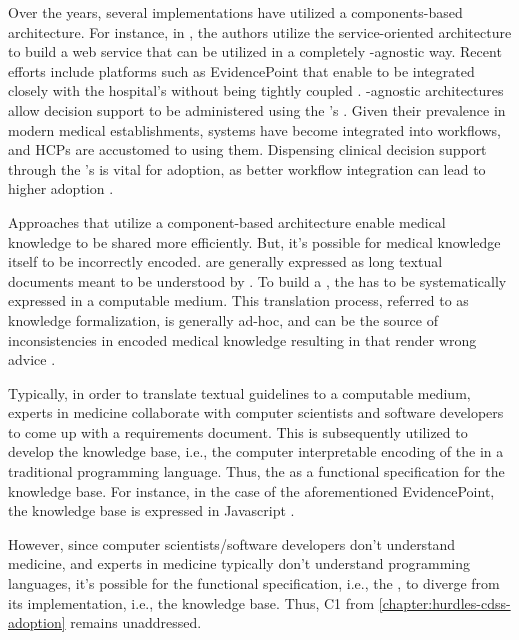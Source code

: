 Over the years, several \CDSS{} implementations have utilized a
components-based architecture. For instance, in \cite{KawamotoJBI10}, the
authors utilize the service-oriented architecture \cite{ErlBook05} to build
a \CDSS{} web service that can be utilized in a completely \EHR{}-agnostic way.
Recent efforts include \CDSSs{} platforms such as
EvidencePoint that enable \CDSS{} to be integrated
closely with the hospital's \EHR{} without being tightly coupled \cite{SolomonJMIR23}.
\EHR{}-agnostic architectures allow decision support to be administered using the
\EHR{}'s \UI{}. Given their prevalence in modern medical establishments,
\EHR{} systems have become integrated into workflows,
and HCPs are accustomed to using them. Dispensing clinical decision
support through the \EHR{}'s \UI{} is vital for adoption, as better workflow
integration can lead to higher adoption \cite{PressJMIR16,LiJMI16}.

Approaches that utilize a component-based architecture
enable medical knowledge to be shared more efficiently.
But, it's possible for medical knowledge itself to be incorrectly
encoded. \BPGs{} are generally expressed as long textual documents meant to
be understood by \HCPs{} \cite{SchiffmanYMI13}. To build a \CDSS{}, the \BPG{} has to be
systematically expressed in a computable medium. This translation process,
referred to as knowledge formalization, is generally ad-hoc, and can be
the source of inconsistencies in encoded medical knowledge
resulting in \CDSSs{} that render wrong advice \cite{ShaharIOS04}.

Typically, in order to translate textual guidelines to a computable
medium, experts in medicine collaborate with computer scientists and
software developers to come up with a requirements document.
This is subsequently utilized to develop the knowledge base, i.e.,
the computer interpretable encoding of the \BPG{} \cite{PelegJBI13} in a
traditional programming language. Thus, the \BPG{} as a
functional specification for the knowledge base.
For instance, in the case of the aforementioned EvidencePoint,
the knowledge base is expressed in  Javascript \cite{SolomonJMIR23}.

However, since computer scientists/software
developers don't understand medicine, and experts in medicine typically
don't understand programming languages,
it's possible for the functional specification, i.e., the \BPG{}, to
diverge from its implementation, i.e., the knowledge base. Thus,
C1 from \autoref{chapter:hurdles-cdss-adoption} remains unaddressed.

